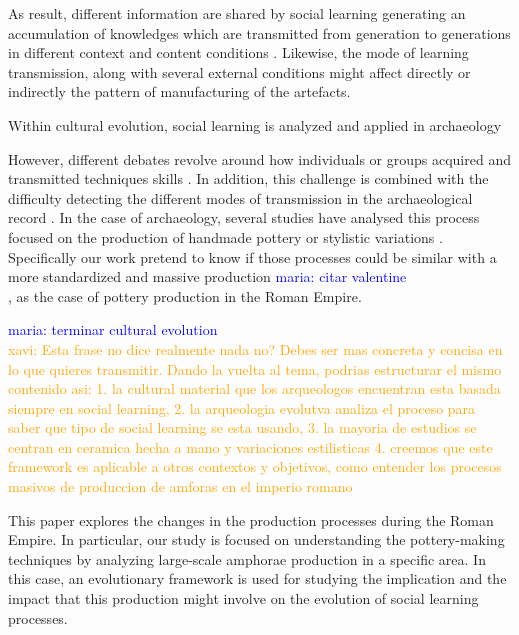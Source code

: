 \documentclass[review]{elsarticle}
\newcommand{\memo}[2]{\textcolor{#1}{#2}}
\newcommand{\xavi}[1]{\memo{orange}{xavi: #1\\}}
\newcommand{\maria}[1]{\memo{blue}{maria: #1\\}}
\begin{document}

As result, different information are shared by social learning generating an accumulation of knowledges which are transmitted from generation to generations in different context and content conditions  \citep{eerkens_jelmer_cultural_2005, neff1992ceramics,henrich_evolution_2003, boyd_cultural_2011}. Likewise, the mode of learning transmission, along with several external conditions might affect directly or indirectly the pattern of manufacturing of the artefacts.

Within cultural evolution, social learning is analyzed and applied in archaeology 

However, different debates revolve around how individuals or groups acquired and transmitted techniques skills  \citep{bowser_learning_2008, mesoudi_cultural_2008}. In addition, this challenge is combined with the difficulty detecting the different modes of transmission in the archaeological record \citep{roux_standardization_2015}. In the case of archaeology, several studies have analysed this process focused on the production of handmade pottery \citep{steele_james_ceramic_2010} or stylistic variations \citep{neiman_stylistic_1995, shennan_ceramic_2001}. Specifically our work pretend to know if those processes could be similar with a more standardized and massive production \maria{citar valentine}, as the case of pottery production in the Roman Empire. 

\maria{terminar cultural evolution}
\xavi{Esta frase no dice realmente nada no? Debes ser mas concreta y concisa en lo que quieres transmitir. Dando la vuelta al tema, podrias estructurar el mismo contenido asi: 1. la cultural material que los arqueologos encuentran esta basada siempre en social learning, 2. la arqueologia evolutva analiza el proceso para saber que tipo de social learning se esta usando, 3. la mayoria de estudios se centran en ceramica hecha a mano y variaciones estilisticas 4. creemos que este framework es aplicable a otros contextos y objetivos, como entender los procesos masivos de produccion de amforas en el imperio romano}




This paper explores the changes in the production processes during the Roman Empire. In particular, our study is focused on understanding the pottery-making techniques by analyzing large-scale amphorae production in a specific  area. In this case, an evolutionary framework is used for studying the implication and the impact that this production might involve on the  evolution of social learning processes.  
\end{document}
